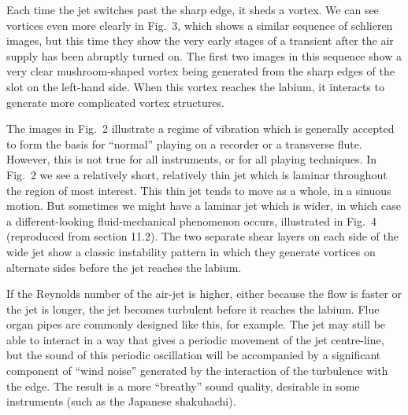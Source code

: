   Each time the jet switches past the sharp edge, it sheds a vortex. We can see 
  vortices even more clearly in Fig.\ 3, which shows a similar sequence of 
  schlieren images, but this time they show the very early stages of a 
  transient after the air supply has been abruptly turned on. The first two 
  images in this sequence show a very clear mushroom-shaped vortex being 
  generated from the sharp edges of the slot on the left-hand side. When this 
  vortex reaches the labium, it interacts to generate more complicated vortex 
  structures. 







  The images in Fig.\ 2 illustrate a regime of vibration which is generally 
  accepted to form the basis for “normal” playing on a recorder or a transverse 
  flute. However, this is not true for all instruments, or for all playing 
  techniques. In Fig.\ 2 we see a relatively short, relatively thin jet which 
  is laminar throughout the region of most interest. This thin jet tends to 
  move as a whole, in a sinuous motion. But sometimes we might have a laminar 
  jet which is wider, in which case a different-looking fluid-mechanical 
  phenomenon occurs, illustrated in Fig.\ 4 (reproduced from section 11.2). The 
  two separate shear layers on each side of the wide jet show a classic 
  instability pattern in which they generate vortices on alternate sides before 
  the jet reaches the labium. 


  If the Reynolds number of the air-jet is higher, either because the flow is 
  faster or the jet is longer, the jet becomes turbulent before it reaches the 
  labium. Flue organ pipes are commonly designed like this, for example. The 
  jet may still be able to interact in a way that gives a periodic movement of 
  the jet centre-line, but the sound of this periodic oscillation will be 
  accompanied by a significant component of “wind noise” generated by the 
  interaction of the turbulence with the edge. The result is a more “breathy” 
  sound quality, desirable in some instruments (such as the Japanese 
  shakuhachi). 

